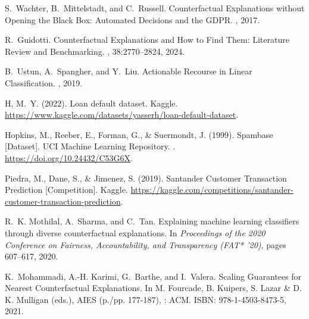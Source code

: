 \documentclass[12pt]{extarticle}
\numberwithin{equation}{section}
\begin{document}
\begin{thebibliography}{99}

S.~Wachter, B.~Mittelstadt, and C.~Russell.
\newblock Counterfactual Explanations without Opening the Black Box: Automated Decisions and the GDPR.
, 2017.

R.~Guidotti.
\newblock Counterfactual Explanations and How to Find Them: Literature Review and Benchmarking.
, 38:2770--2824, 2024.

B.~Ustun, A.~Spangher, and Y.~Liu.
\newblock Actionable Recourse in Linear Classification.
, 2019.

\newblock H, M.~Y. (2022). Loan default dataset. Kaggle. 
\newblock \url{https://www.kaggle.com/datasets/yasserh/loan-default-dataset}.

\newblock Hopkins, M., Reeber, E., Forman, G., \& Suermondt, J. (1999). Spambase [Dataset]. UCI Machine Learning Repository. .
\newblock \url{https://doi.org/10.24432/C53G6X}.

\newblock Piedra, M., Dane, S., \& Jimenez, S. (2019). Santander Customer Transaction Prediction [Competition]. Kaggle.
\newblock \url{https://kaggle.com/competitions/santander-customer-transaction-prediction}.

R.~K. Mothilal, A.~Sharma, and C.~Tan.
\newblock Explaining machine learning classifiers through diverse counterfactual explanations.
\newblock In {\em Proceedings of the 2020 Conference on Fairness, Accountability, and Transparency (FAT* '20)}, pages 607--617, 2020.

K.~Mohammadi, A.-H. Karimi, G.~Barthe, and I.~Valera.
\newblock Scaling Guarantees for Nearest Counterfactual Explanations.
\newblock In M. Fourcade, B. Kuipers, S. Lazar \& D. K. Mulligan (eds.), AIES (p./pp. 177-187), : ACM. ISBN: 978-1-4503-8473-5, 2021.
\end{thebibliography}

\newpage
\tableofcontents
\thispagestyle{fancy}
\newpage
\setcounter{page}{1}
\fancyfoot[C]{
    \begin{center}
        \thepage
    \end{center}
} 
\renewcommand{\footrulewidth}{0.4pt}
\setlength{\footskip}{0.8cm}
\end{document}
